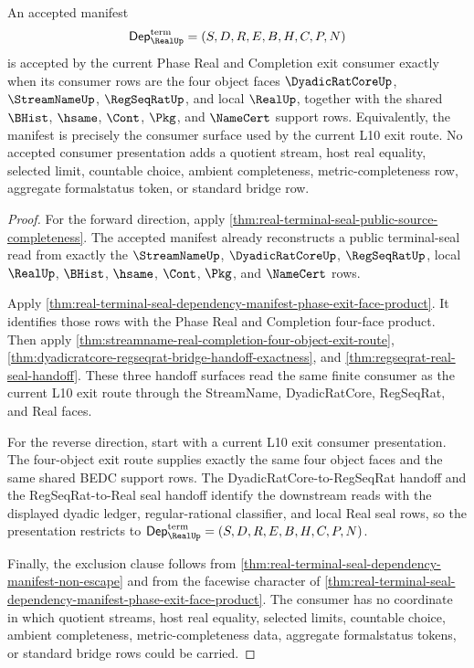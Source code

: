 \begin{theorem}
\label{thm:real-terminal-seal-manifest-exit-consumer-exactness}
An accepted manifest
$$
\mathsf{Dep}_{\RealUp}^{\mathrm{term}}=(S,D,R,E,B,H,C,P,N)
$$
is accepted by the current Phase Real and Completion exit consumer exactly when
its consumer rows are the four object faces
$\DyadicRatCoreUp$, $\StreamNameUp$, $\RegSeqRatUp$, and local $\RealUp$,
together with the shared $\BHist$, $\hsame$, $\Cont$, $\Pkg$, and $\NameCert$
support rows. Equivalently, the manifest is precisely the consumer surface used
by the current L10 exit route. No accepted consumer presentation adds a
quotient stream, host real equality, selected limit, countable choice, ambient
completeness, metric-completeness row, aggregate formalstatus token, or standard
bridge row.
\end{theorem}
\begin{proof}
For the forward direction, apply
\autoref{thm:real-terminal-seal-public-source-completeness}. The accepted
manifest already reconstructs a public terminal-seal read from exactly the
$\StreamNameUp$, $\DyadicRatCoreUp$, $\RegSeqRatUp$, local $\RealUp$, $\BHist$,
$\hsame$, $\Cont$, $\Pkg$, and $\NameCert$ rows.

Apply
\autoref{thm:real-terminal-seal-dependency-manifest-phase-exit-face-product}.
It identifies those rows with the Phase Real and Completion four-face product.
Then apply \autoref{thm:streamname-real-completion-four-object-exit-route},
\autoref{thm:dyadicratcore-regseqrat-bridge-handoff-exactness}, and
\autoref{thm:regseqrat-real-seal-handoff}. These three handoff surfaces read
the same finite consumer as the current L10 exit route through the StreamName,
DyadicRatCore, RegSeqRat, and Real faces.

For the reverse direction, start with a current L10 exit consumer presentation.
The four-object exit route supplies exactly the same four object faces and the
same shared BEDC support rows. The DyadicRatCore-to-RegSeqRat handoff and the
RegSeqRat-to-Real seal handoff identify the downstream reads with the displayed
dyadic ledger, regular-rational classifier, and local Real seal rows, so the
presentation restricts to
$\mathsf{Dep}_{\RealUp}^{\mathrm{term}}=(S,D,R,E,B,H,C,P,N)$.

Finally, the exclusion clause follows from
\autoref{thm:real-terminal-seal-dependency-manifest-non-escape} and from the
facewise character of
\autoref{thm:real-terminal-seal-dependency-manifest-phase-exit-face-product}.
The consumer has no coordinate in which quotient streams, host real equality,
selected limits, countable choice, ambient completeness, metric-completeness
data, aggregate formalstatus tokens, or standard bridge rows could be carried.
\end{proof}

